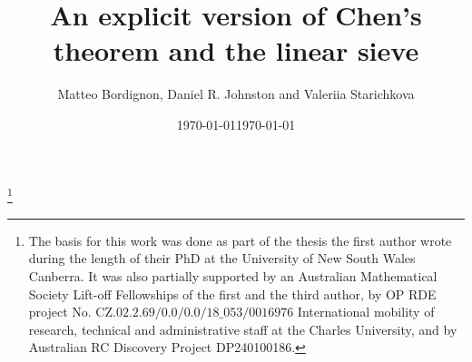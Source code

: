 \documentclass[12pt]{amsart}
\begin{document}
\def\vec#1{\mathbf{#1}}
\def\inv#1{\overline{#1}}
\def\num#1{\mathrm{num}(#1)}
\def\dist{\mathrm{dist}}

\def\fA{{\mathfrak A}}
\def\fB{{\mathfrak B}}
\def\fC{{\mathfrak C}}
\def\fU{{\mathfrak U}}
\def\fV{{\mathfrak V}}

\newcommand{\bflambda}{{\boldsymbol{\lambda}}}
\newcommand{\bfxi}{{\boldsymbol{\xi}}}
\newcommand{\bfrho}{{\boldsymbol{\rho}}}
\newcommand{\bfnu}{{\boldsymbol{\nu}}}

\def\GL{\mathrm{GL}}
\def\SL{\mathrm{SL}}

\def\Hba{\overline{\cH}_{a,m}}
\def\Hta{\widetilde{\cH}_{a,m}}
\def\Hb1{\overline{\cH}_{m}}
\def\Ht1{\widetilde{\cH}_{m}}

\def\flp#1{{\left\langle#1\right\rangle}_p}
\def\flm#1{{\left\langle#1\right\rangle}_m}
\def\dmod#1#2{\left\|#1\right\|_{#2}}
\def\dmodq#1{\left\|#1\right\|_q}

\def\Zm{\Z/m\Z}

\def\Err{{\mathbf{E}}}

\newcommand{\comm}[1]{\marginpar{%
\vskip-\baselineskip %
\raggedright\footnotesize
\itshape\hrule\smallskip#1\par\smallskip\hrule}}

\def\xxx{\vskip5pt\hrule\vskip5pt}

\def\cc#1{\textcolor{red}{#1}}

\newenvironment{nouppercase}{%
  \let\uppercase\relax%
  \renewcommand{\uppercasenonmath}[1]{}}{}
  

\title{An explicit version of Chen's theorem and the linear sieve}
\author{Matteo Bordignon, Daniel R. Johnston and Valeriia Starichkova}
\address{KTH Royal Institute of Technology, Stockholm \newline and \newline Charles University, Faculty of Mathematics and Physics, Department of Algebra, Sokolovská 83, 186 00 Praha 8, Czech Republic Department of Mathematics}
\address{The University of New South Wales Canberra, School of Science}
\address{The University of New South Wales Canberra, School of Science}
\date\today
\thanks{The basis for this work was done as part of the thesis the first author wrote during the length of their PhD at the University of New South Wales Canberra. It was also partially supported by an Australian Mathematical Society Lift-off Fellowships of the first and the third author, by OP RDE project No.
CZ.$02.2.69/0.0/0.0/18\_053/0016976$ International mobility of research, technical and administrative staff at the Charles University, and by Australian RC Discovery Project DP240100186.}
\date{\today
}
\end{document}
